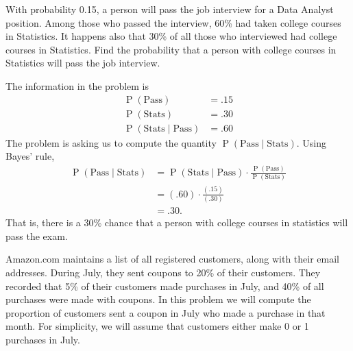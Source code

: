 \documentclass[11pt]{exam}
\DeclareMathOperator*{\Prob}{P}
\renewcommand{\Pr}{\Prob}
\begin{document}
\begin{questions}
\begin{parts}

\end{parts}

\newpage

\question  With probability 0.15, a person will pass the job interview for a Data Analyst position. 
Among those who passed the interview, 60\% had taken college courses in Statistics. It
happens also that 30\% of all those who interviewed had college courses in
Statistics. Find the probability that a person with college courses in Statistics
will pass the job interview.


\begin{solution}
The information in the problem is
\begin{align*}
\Pr(\text{Pass}) &= .15 \\
\Pr(\text{Stats}) &= .30 \\
\Pr(\text{Stats} \mid \text{Pass}) &= .60
\end{align*}
The problem is asking us to compute the quantity
\(
  \Pr(\text{Pass} \mid \text{Stats}).
\)
Using Bayes' rule,
\begin{align*}
  \Pr(\text{Pass} \mid \text{Stats})
  &= \Pr(\text{Stats} \mid \text{Pass})
  \cdot \frac{\Pr(\text{Pass})}{\Pr(\text{Stats})}  \\
  &= (.60) \cdot \frac{(.15)}{(.30)} \\
  &= .30.
\end{align*}
That is, there is a 30\% chance that a person with college courses in statistics
will pass the exam.
\end{solution}


\question Amazon.com maintains a list of all registered customers, along with
their email addresses.  During July, they sent coupons to 20\% of their
customers.  They recorded that 5\% of their customers made purchases in July,
and 40\% of all purchases were made with coupons.  In this problem we will
compute the proportion of customers sent a coupon in July who made a
purchase in that month.  For simplicity, we will assume that customers either
make 0 or 1 purchases in July.


\end{questions}
\end{document}
